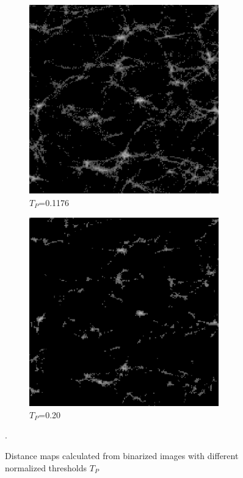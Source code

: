 \begin{figure}[H]
\begin{minipage}{0.5\textwidth}
  \begin{subfigure}{0.5\textwidth}
    \centering
    \includegraphics[width=0.9\textwidth]{Figures/chapter-image/distance/fig_dist_01176Otsu.png}
    \caption{$T_P$=0.1176}
    \label{distotsu}
  \end{subfigure}%
  \begin{subfigure}{0.5\textwidth}
    \centering
    \includegraphics[width=0.9\textwidth]{Figures/chapter-image/distance/fig_dist_20.png}
    \caption{$T_P$=0.20}
    \label{dist014}
  \end{subfigure}
\end{minipage}
\caption[Distance map - Actin]{ Distance maps calculated from binarized images
with different normalized thresholds $T_P$}.
\label{fig:distancemap}
\end{figure}

